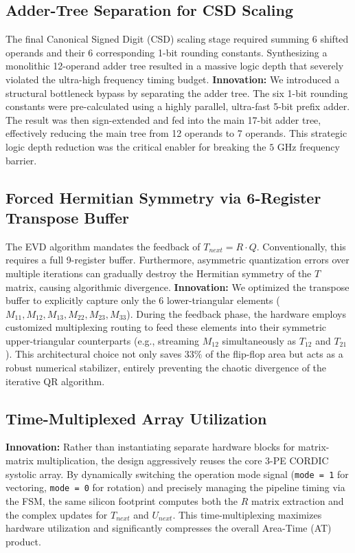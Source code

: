 \documentclass[11pt, a4paper]{article}
\begin{document}
\subsection{Adder-Tree Separation for CSD Scaling}
The final Canonical Signed Digit (CSD) scaling stage required summing 6 shifted operands and their 6 corresponding 1-bit rounding constants. Synthesizing a monolithic 12-operand adder tree resulted in a massive logic depth that severely violated the ultra-high frequency timing budget.
\textbf{Innovation:} We introduced a structural bottleneck bypass by separating the adder tree. The six 1-bit rounding constants were pre-calculated using a highly parallel, ultra-fast 5-bit prefix adder. The result was then sign-extended and fed into the main 17-bit adder tree, effectively reducing the main tree from 12 operands to 7 operands. This strategic logic depth reduction was the critical enabler for breaking the $5 \text{ GHz}$ frequency barrier.

\subsection{Forced Hermitian Symmetry via 6-Register Transpose Buffer}
The EVD algorithm mandates the feedback of $T_{next} = R \cdot Q$. Conventionally, this requires a full 9-register buffer. Furthermore, asymmetric quantization errors over multiple iterations can gradually destroy the Hermitian symmetry of the $T$ matrix, causing algorithmic divergence.
\textbf{Innovation:} We optimized the transpose buffer to explicitly capture only the 6 lower-triangular elements ($M_{11}, M_{12}, M_{13}, M_{22}, M_{23}, M_{33}$). During the feedback phase, the hardware employs customized multiplexing routing to feed these elements into their symmetric upper-triangular counterparts (e.g., streaming $M_{12}$ simultaneously as $T_{12}$ and $T_{21}$). This architectural choice not only saves $33\%$ of the flip-flop area but acts as a robust numerical stabilizer, entirely preventing the chaotic divergence of the iterative QR algorithm.

\subsection{Time-Multiplexed Array Utilization}
\textbf{Innovation:} Rather than instantiating separate hardware blocks for matrix-matrix multiplication, the design aggressively reuses the core 3-PE CORDIC systolic array. By dynamically switching the operation mode signal (\texttt{mode = 1} for vectoring, \texttt{mode = 0} for rotation) and precisely managing the pipeline timing via the FSM, the same silicon footprint computes both the $R$ matrix extraction and the complex updates for $T_{next}$ and $U_{next}$. This time-multiplexing maximizes hardware utilization and significantly compresses the overall Area-Time (AT) product.
\end{document}
